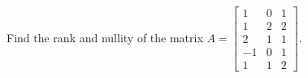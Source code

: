 Find the rank and nullity of the matrix 
$A = \begin{bmatrix} 
1 & 0 & 1\\ 
1 & 2 & 2\\ 
2 & 1 & 1\\ 
-1 & 0 & 1\\
1 & 1 & 2 
\end{bmatrix}$.